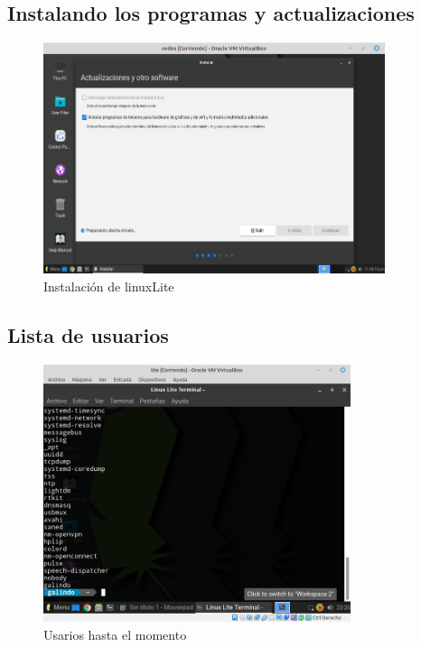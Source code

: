 \documentclass[11pt]{article}
\begin{document}
\subsection{Instalando los programas y actualizaciones}
\label{sec:org8be8722}
\begin{figure}[htbp]
\centering
\includegraphics[width=10cm]{img/Captura de pantalla de 2023-09-17 21-58-10.png}
\caption{Instalación de linuxLite}
\end{figure}

\pagebreak

\subsection{Lista de usuarios}
\label{sec:orge508fa1}
\begin{figure}[htbp]
\centering
\includegraphics[width=9cm]{img/usuarios.png}
\caption{Usarios hasta el momento}
\end{figure}
\end{document}
